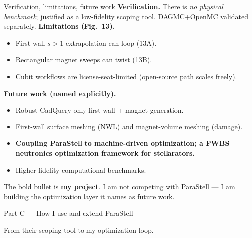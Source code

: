 \documentclass[aspectratio=169]{beamer}
\newcommand{\kb}[1]{\begin{tcolorbox}[colback=key!5,colframe=key!60,boxsep=2pt,left=4pt,right=4pt,top=3pt,bottom=3pt]#1\end{tcolorbox}}
\begin{document}
\begin{frame}{Verification, limitations, future work}
  \textbf{Verification.} There is \emph{no physical benchmark}; justified as a low-fidelity scoping tool. DAGMC+OpenMC validated separately.
  \vspace{0.3em}
  \textbf{Limitations (Fig.~13).}
  \begin{itemize}\small
    \item First-wall $s>1$ extrapolation can loop (13A).
    \item Rectangular magnet sweeps can twist (13B).
    \item Cubit workflows are license-seat-limited (open-source path scales freely).
  \end{itemize}
  \textbf{Future work (named explicitly).}
  \begin{itemize}\small
    \item Robust CadQuery-only first-wall + magnet generation.
    \item First-wall surface meshing (NWL) and magnet-volume meshing (damage).
    \item \textbf{\color{key}Coupling ParaStell to machine-driven optimization; a FWBS neutronics optimization framework for stellarators.}
    \item Higher-fidelity computational benchmarks.
  \end{itemize}
  \kb{\footnotesize The bold bullet is \textbf{my project}. I am not competing with ParaStell --- I am building the optimization layer it names as future work.}
\end{frame}

\begin{frame}{Part C --- How I use and extend ParaStell}
  \begin{center}\Large\color{key} From their scoping tool to my optimization loop.\end{center}
\end{frame}
\end{document}
